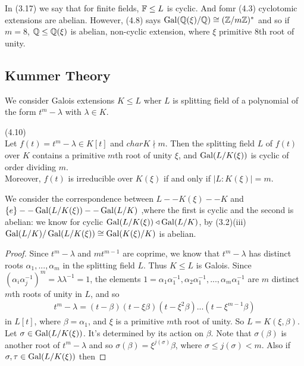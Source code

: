 \documentclass[a4paper]{article}
\begin{document}
\begin{eg}
In (3.17) we say that for finite fields, $\mathbb{F} \leq L$ is cyclic. And fomr (4.3) cyclotomic extensions are abelian. However, (4.8) says $\operatorname{Gal}(\mathbb{Q}(\xi)/\mathbb{Q}) \cong (\mathbb{Z}/m\mathbb{Z})^*$ and so if $m=8$, $\mathbb{Q} \leq \mathbb{Q}(\xi)$ is abelian, non-cyclic extension, where $\xi$ primitive $8$th root of unity.
\end{eg}

\subsection{Kummer Theory}
We consider Galois extensions $K \leq L$ wher $L$ is splitting field of a polynomial of the form $t^m-\lambda$ with $\lambda \in K$.

\begin{thm} (4.10)\\
Let $f(t) = t^m-\lambda \in K[t]$ and $char K \nmid m$. Then the splitting field $L$ of $f(t)$ over $K$ contains a primitive $m$th root of unity $\xi$, and $\operatorname{Gal}(L/K(\xi))$ is cyclic of order dividing $m$.\\
Moreover, $f(t)$ is irreducible over $K(\xi)$ if and only if $|L:K(\xi)| = m$.
\begin{rem}
We consider the correspondence between $L -- K(\xi) -- K$ and $\{e\} -- \operatorname{Gal}(L/K(\xi)) -- \operatorname{Gal}(L/K)$ ,where the first is cyclic and the second is abelian: we know for cyclic $\operatorname{Gal}(L/K(\xi)) \triangleleft \operatorname{Gal}(L/K)$, by (3.2)(iii) $\operatorname{Gal}(L/K)/\operatorname{Gal}(L/K(\xi)) \cong \operatorname{Gal}(K(\xi) / K)$ is abelian.
\begin{proof}
Since $t^m-\lambda$ and $mt^{m-1}$ are coprime, we know that $t^m-\lambda$ has distinct roots $\alpha_1,...,\alpha_m$ in the splitting field $L$. Thus $K \leq L$ is Galois. Since $(\alpha_i\alpha_j^{-1})^m = \lambda \lambda^{-1} = 1$, the elements $1 = \alpha_1\alpha_1^{-1},\alpha_2\alpha_1^{-1},...,\alpha_m\alpha_1^{-1}$ are $m$ distinct $m$th roots of unity in $L$, and so 
\begin{equation*}
\begin{aligned}
t^m-\lambda = (t-\beta)(t-\xi\beta)(t-\xi^2\beta)...(t-\xi^{m-1}\beta)
\end{aligned}
\end{equation*}
in $L[t]$, where $\beta = \alpha_1$, and $\xi$ is a primitive $m$th root of unity. So $L = K(\xi,\beta)$. Let $\sigma \in \operatorname{Gal}(L/K(\xi))$. It's determined by its action on $\beta$. Note that $\sigma(\beta)$ is another root of $t^m-\lambda$ and so $\sigma(\beta) = \xi^{j(\sigma)}\beta$, where $\sigma \leq j(\sigma) < m$. Also if $\sigma,\tau \in \operatorname{Gal}(L/K(\xi))$ then 

\end{proof}
\end{rem}
\end{thm}
\end{document}
